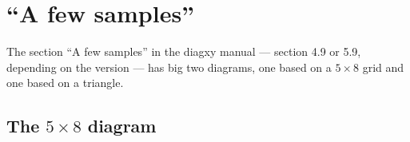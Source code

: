 \documentclass[oneside]{article}
\begin{document}

\section{``A few samples''}
\label{a-few-samples}

The section ``A few samples'' in the diagxy manual --- section 4.9 or
5.9, depending on the version --- has big two diagrams, one based on a
$5 \times 8$ grid and one based on a triangle.

%                 
\subsection{The $5 \times 8$ diagram}
\end{document}
